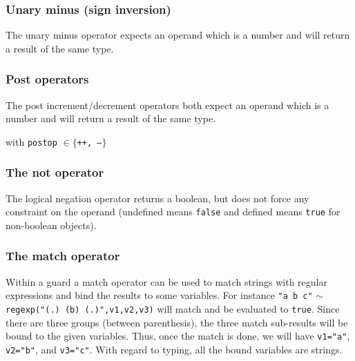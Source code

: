 \documentclass[11pt]{article}
\begin{document}
\subsubsection{Unary minus (sign inversion)}

The unary minus operator expects an operand which is a number and will return a result of the same type.

\begin{center}
\DP
\end{center}

\subsubsection{Post operators}

The post increment/decrement operators both expect an operand which is a number and will return a result of the same type.

\begin{center}
\DP
\end{center}
\begin{center}with  \texttt{postop} $\in \{$\texttt{++, --}$\}$\end{center}

\subsubsection{The not operator}

The logical negation operator returns a boolean, but does not force any constraint on the operand (undefined means \texttt{false} and defined means \texttt{true} for non-boolean objects).

\begin{center}
\DP
\end{center}

\subsubsection{The match operator}

Within a guard a match operator can be used to match strings with regular expressions and bind the results to some variables. For instance \texttt{"a b c"} $\sim$ \texttt{regexp("(.) (b) (.)",v1,v2,v3)} will match and be evaluated to \texttt{true}. Since there are three groups (between parenthesis), the three match sub-results will be bound to the given variables. Thus, once the match is done, we will have \texttt{v1="a"}, \texttt{v2="b"}, and \texttt{v3="c"}. With regard to typing, all the bound variables are strings.
\end{document}
